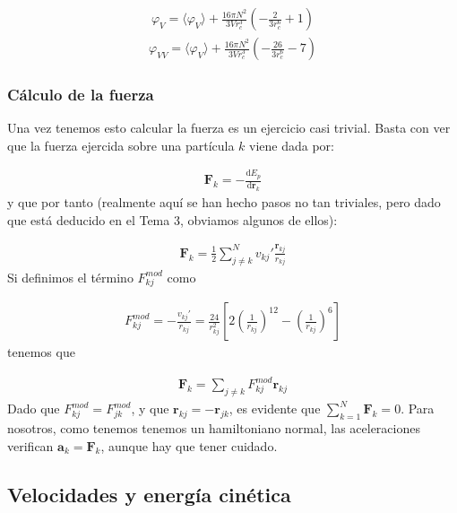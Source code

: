 \documentclass[11pt]{article}
\newcommand{\rn}{\mathbf{r}}
\newcommand{\Fn}{\mathbf{F}}
\newcommand{\an}{\mathbf{a}}
\newcommand{\parentesis}[1]{\left( #1  \right)}
\newcommand{\ccorchetes}[1]{\left[ #1  \right]}
\newcommand{\D}{\mathrm{d}}
\newcommand{\derivadas}[2]{\frac{\D #1}{\D #2}}
\begin{document}
\begin{eqnarray}
	\varphi_{V} = \langle \varphi_V \rangle  + \frac{16\pi N^2}{3V r_c^3} \parentesis{-\frac{2}{3 r_c^6}+1}
\end{eqnarray}
\begin{eqnarray}
	\varphi_{VV} = \langle \varphi_V \rangle  + \frac{16\pi N^2}{3V r_c^3} \parentesis{-\frac{26}{3 r_c^6}-7}
\end{eqnarray}

\subsubsection{Cálculo de la fuerza}

Una vez tenemos esto calcular la fuerza es un ejercicio casi trivial. Basta con ver que la fuerza ejercida sobre una partícula $k$ viene dada por:

\begin{eqnarray}
	\Fn_{k} = - \derivadas{E_p}{\rn_k}
\end{eqnarray}
y que por tanto (realmente aquí se han hecho pasos no tan triviales, pero dado que está deducido en el Tema 3, obviamos algunos de ellos):

\begin{eqnarray}
	\Fn_{k} =\frac{1}{2}  \sum_{j\neq k}^N v_{kj}' \frac{\rn_{kj}}{r_{kj}}
\end{eqnarray}
Si definimos el término $F_{kj}^{mod}$ como

\begin{eqnarray}
	F_{kj}^{mod} =- \frac{v_{kj}'}{r_{kj}} = \frac{24}{r_{kj}^2} \ccorchetes{2 \parentesis{\frac{1}{r_{kj}}}^{12}-\parentesis{\frac{1}{r_{kj}}}^6}
\end{eqnarray}
tenemos que 

\begin{eqnarray}
	\Fn_{k} = \sum_{j \neq k} F_{kj}^{mod} \rn_{kj}
\end{eqnarray}
Dado que $F_{kj}^{mod}=F_{jk}^{mod}$, y que $\rn_{kj}=-\rn_{jk}$, es evidente que $\sum_{k=1}^N \Fn_k=0$. Para nosotros, como tenemos tenemos un hamiltoniano normal, las aceleraciones verifican $\an_k = \Fn_k$, aunque hay que tener cuidado.


\subsection{Velocidades y energía cinética}
\end{document}
